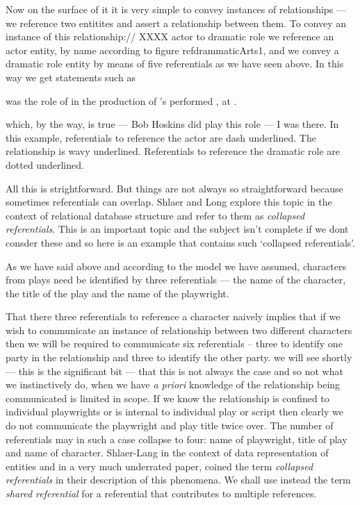 \mynote 
Now on the surface of it it is very simple
to convey instances of relationships --- we reference two entitites and assert a relationship between them. 
To convey an instance of this relationship://
XXXX actor to dramatic role
we reference an actor entity, by name according to figure ref{drammaticArts1},
and we convey a dramatic role entity by means of five referentials as we have seen above.
In this way we get statements such as
\begin{erquote}

\parbox{9.0cm}{\linespread{1.5}\normalsize{} was  the role of  in the production of \mbox{'s}  performed \mbox{,} at .
}
\end{erquote}
which, by the way, is true  --- Bob Hoskins did play this role --- I was there.
In this example, referentials to reference the actor are dash underlined. The relationship is wavy underlined.
Referentials to reference the dramatic role are dotted underlined.

All this is strightforward. But things are not always so straightforward because sometimes referentials can overlap. 
Shlaer and Long explore this topic in the context of relational database structure and refer to them as \textit{collapsed referentials}. This is an important topic and the subject isn't complete if we dont 
consder these and so here is an example that contains such `collapsed referentials'.

As we have said above and according to the model we have assumed,
  characters from plays need be identified by three referentials
 --- the name of the character, the title of the play and the name of the playwright.

\mynote 
That there three referentials to reference a character naively implies that if we wish to communicate an instance of relationship between two different characters then we will be required to communicate six referentials
 -- three to identify one party in the relationship and three to identify the other party. 
 we will see shortly  --- this is the significant bit --- that this is not always the case and so not what we instinctively do, when we have \textit{a priori} knowledge of the relationship being communicated is limited in scope. 
 If we know the relationship is confined to individual playwrights or is internal to individual play 
 or script then clearly we do not 
  communicate the playwright and play title twice over. The number of referentials may in such a case collapse to four:
   name of playwright, title of play and name of character.
Shlaer-Lang in the context of data representation of entities and in a very much underrated paper, coined the term \textit{collapsed referentials} in
their description of this phenomena.  We shall use instead the term \textit{shared referential} for a referential that contributes to multiple references.

